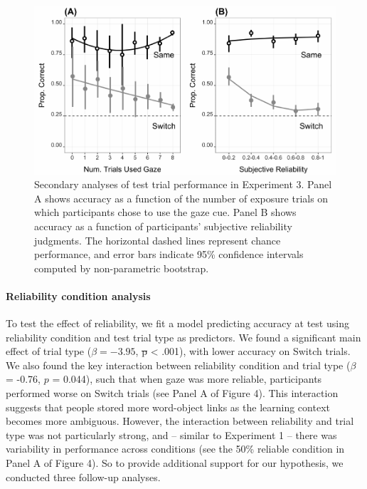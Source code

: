 \documentclass[authoryear, review]{elsarticle}
\newenvironment{CodeChunk}{}{}
\providecommand{\DIFaddtex}[1]{{\protect\color{blue}\uwave{#1}}} %
\providecommand{\DIFdeltex}[1]{{\protect\color{red}\sout{#1}}}                      %
\providecommand{\DIFaddbegin}{} %
\providecommand{\DIFaddend}{} %
\providecommand{\DIFdelbegin}{} %
\providecommand{\DIFdelend}{} %
\providecommand{\DIFadd}[1]{\texorpdfstring{\DIFaddtex{#1}}{#1}} %
\providecommand{\DIFdel}[1]{\texorpdfstring{\DIFdeltex{#1}}{}} %
\begin{document}
\begin{CodeChunk}
\begin{figure}[tb]

{\centering \includegraphics[width=0.9\linewidth]{figs/expt3-sub-plots-1} 

}

\caption[Secondary analyses of test trial performance in Experiment 3]{Secondary analyses of test trial performance in Experiment 3. Panel A shows accuracy as a function of the number of exposure trials on which participants chose to use the gaze cue. Panel B shows accuracy as a function of participants' subjective reliability judgments. The horizontal dashed lines represent chance performance, and error bars indicate 95\% confidence intervals computed by non-parametric bootstrap.}\label{fig:expt3-sub-plots}
\end{figure}
\end{CodeChunk}

\paragraph{Reliability condition
analysis}\label{reliability-condition-analysis}

To test the effect of reliability, we fit a model predicting accuracy at
test using reliability condition and test trial type as predictors. We
found a significant main effect of trial type (\(\beta = -3.95\), \DIFdelbegin \DIFdel{p
}\DIFdelend \DIFaddbegin \DIFadd{\(p\)
}\DIFaddend \textless{} .001), with lower accuracy on Switch trials. We also found
the key interaction between reliability condition and trial type
(\(\beta\) = -0.76, \(p\) = 0.044), such that when gaze was more
reliable, participants performed worse on Switch trials (see Panel A of
Figure 4). This interaction suggests that people stored more word-object
links as the learning context becomes more ambiguous. However, the
interaction between reliability and trial type was not particularly
strong, and -- similar to Experiment 1 -- there was variability in
performance across conditions (see the 50\% reliable condition in Panel
A of Figure 4). So to provide additional support for our hypothesis, we
conducted three follow-up analyses.
\end{document}
